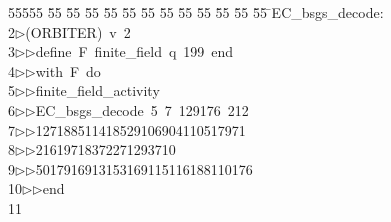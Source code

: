 %
%
\begin{tabbing}
55555 \= 55 \= 55 \= 55 \= 55 \= 55 \= 55 \= 55 \= 55 \= 55 \= 55 \= 55 \= 55 \= \>EC\_bsgs\_decode:\\[0pt]
2\>$\triangleright$\>(ORBITER)\ v\ 2\ \\[0pt]
3\>$\triangleright$\>$\triangleright$\>define\ F\ finite\_field\ q\ 199\ end\ \\[0pt]
4\>$\triangleright$\>$\triangleright$\>with\ F\ do\ \\[0pt]
5\>$\triangleright$\>$\triangleright$\>finite\_field\_activity\ \\[0pt]
6\>$\triangleright$\>$\triangleright$\>EC\_bsgs\_decode\ 5\ 7\ 129176\ 212\ \\[0pt]
7\>$\triangleright$\>$\triangleright$\>127188511418529106904110517971\\[0pt]
8\>$\triangleright$\>$\triangleright$21619718372271293710\ \\[0pt]
9\>$\triangleright$\>$\triangleright$\>5017916913153169115116188110176\ \\[0pt]
10\>$\triangleright$\>$\triangleright$\>end\\[0pt]
11\>\end{tabbing}
